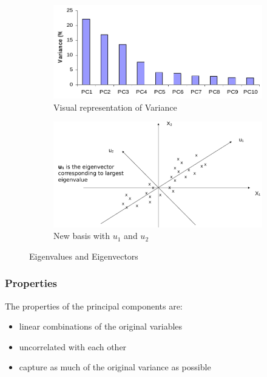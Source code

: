 \begin{figure}[H]
    \begin{subfigure}{.4\textwidth}
        \centering
        \includegraphics[width=1\linewidth]{images/DimRed/PCA5.png}
        \caption{Visual representation of Variance}
        \label{fig:sub1}
    \end{subfigure}
    \begin{subfigure}{.5 \textwidth}
        \centering
        \includegraphics[width=1\linewidth]{images/DimRed/PCA6.png}
        \caption{New basis with $u_1$ and $ u_2$}
        \label{fig:sub1}
    \end{subfigure}
    \caption{Eigenvalues and Eigenvectors}
\end{figure}

\subsubsection{Properties}
 The properties of the principal components are:
 \begin{itemize}
     \item  linear combinations of the original variables
     \item  uncorrelated with each other
     \item capture as much of the original variance as possible
 \end{itemize}

